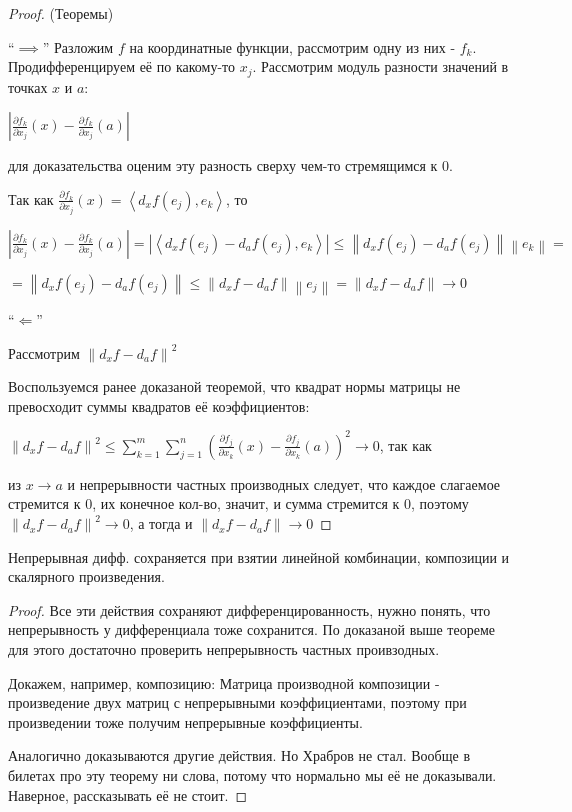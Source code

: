 \begin{proof} (Теоремы)\slashns
	
	
	``$\implies$''
	Разложим $f$ на координатные функции, рассмотрим одну из них - $f_k$. Продифференцируем её по какому-то $x_j$. Рассмотрим модуль разности значений в точках $x$ и $a$:

	$\left|\frac{\partial f_k}{\partial x_j}(x) - \frac{\partial f_k}{\partial x_j}(a)\right|$

	для доказательства оценим эту разность сверху чем-то стремящимся к 0.

	Так как $\frac{\partial f_k}{\partial x_j} (x) = \left<d_x f(e_j), e_k\right>$, то

	$\left|\frac{\partial f_k}{\partial x_j}(x) - \frac{\partial f_k}{\partial x_j}(a)\right| = \left|\left<d_x f(e_j)-d_a f(e_j), e_k\right>\right| \le \left\|d_x f(e_j)-d_a f(e_j)\right\| \left\|e_k\right\|=$

	$=\left\|d_x f(e_j)-d_a f(e_j)\right\|\le \left\|d_x f-d_a f\right\| \left\|e_j\right\|=\left\|d_x f-d_a f\right\|\to 0$
	
	``$\Longleftarrow$''

	Рассмотрим $\left\|d_x f - d_a f\right\|^2$

	Воспользуемся ранее доказаной теоремой, что квадрат нормы матрицы не превосходит суммы квадратов её коэффициентов:
	
	$\left\|d_x f - d_a f\right\|^2 \le \sum\limits_{k = 1}^{m}\sum\limits_{j = 1}^{n}(\frac{\partial f_j}{\partial x_k}(x) - \frac{\partial f_j}{\partial x_k}(a))^2 \to 0$, так как

	из $x\to a$ и непрерывности частных производных следует, что каждое слагаемое стремится к 0, их конечное кол-во, значит, и сумма стремится к 0, поэтому $\left\|d_x f - d_a f\right\|^2\to0$, а тогда и $\left\|d_x f - d_a f\right\|\to0$
\end{proof}

\begin{theorem}\slashns
	
	Непрерывная дифф. сохраняется при взятии линейной комбинации, композиции и скалярного произведения.
\end{theorem}


\begin{proof} \slashns
	
	Все эти действия сохраняют дифференцированность, нужно понять, что непрерывность у дифференциала тоже сохранится. По доказаной выше теореме для этого достаточно проверить непрерывность частных проивзодных.

	Докажем, например, композицию: Матрица производной композиции - произведение двух матриц с непрерывными коэффициентами, поэтому при произведении тоже получим непрерывные коэффициенты.

	Аналогично доказываются другие действия. Но Храбров не стал. Вообще в билетах про эту теорему ни слова, потому что нормально мы её не доказывали. Наверное, рассказывать её не стоит.
\end{proof}